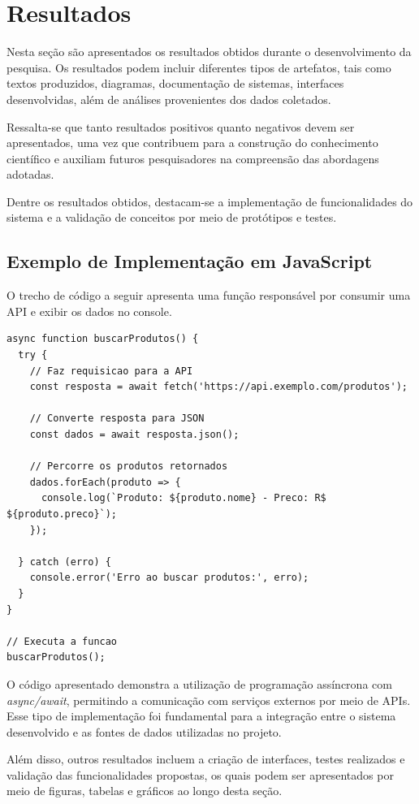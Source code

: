\chapter{Resultados} \label{cap:05}


Nesta seção são apresentados os resultados obtidos durante o desenvolvimento da pesquisa. Os resultados podem incluir diferentes tipos de artefatos, tais como textos produzidos, diagramas, documentação de sistemas, interfaces desenvolvidas, além de análises provenientes dos dados coletados.

Ressalta-se que tanto resultados positivos quanto negativos devem ser apresentados, uma vez que contribuem para a construção do conhecimento científico e auxiliam futuros pesquisadores na compreensão das abordagens adotadas.

Dentre os resultados obtidos, destacam-se a implementação de funcionalidades do sistema e a validação de conceitos por meio de protótipos e testes.

\section{Exemplo de Implementação em JavaScript}

O trecho de código a seguir apresenta uma função responsável por consumir uma API e exibir os dados no console.

\begin{lstlisting}[caption={Requisição a uma API utilizando JavaScript}]
async function buscarProdutos() {
  try {
    // Faz requisicao para a API
    const resposta = await fetch('https://api.exemplo.com/produtos');
    
    // Converte resposta para JSON
    const dados = await resposta.json();

    // Percorre os produtos retornados
    dados.forEach(produto => {
      console.log(`Produto: ${produto.nome} - Preco: R$ ${produto.preco}`);
    });

  } catch (erro) {
    console.error('Erro ao buscar produtos:', erro);
  }
}

// Executa a funcao
buscarProdutos();
\end{lstlisting}

O código apresentado demonstra a utilização de programação assíncrona com \textit{async/await}, permitindo a comunicação com serviços externos por meio de APIs. Esse tipo de implementação foi fundamental para a integração entre o sistema desenvolvido e as fontes de dados utilizadas no projeto.

Além disso, outros resultados incluem a criação de interfaces, testes realizados e validação das funcionalidades propostas, os quais podem ser apresentados por meio de figuras, tabelas e gráficos ao longo desta seção.
